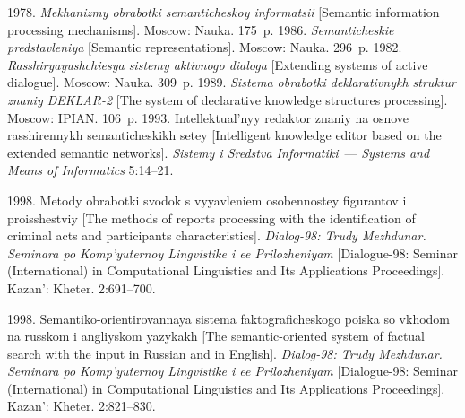 
 \vspace*{-6pt}

 \begin{multicols}{2}

 \renewcommand{\bibname}{\protect\rmfamily References}

 {\small\frenchspacing
 {%
 \begin{thebibliography}{99}
 1978. \textit{Mekhanizmy obrabotki semanticheskoy informatsii} [Semantic information
processing mechanisms]. Moscow: Nauka. 175~p.
 1986. \textit{Semanticheskie predstavleniya} [Semantic representations]. Moscow:
Nauka. 296~p.
 1982. \textit{Rasshiryayushchiesya sistemy aktivnogo dialoga} [Extending systems of
active dialogue]. Moscow: Nauka. 309~p.
 1989. \textit{Sistema obrabotki deklarativnykh struktur znaniy
 \mbox{DEKLAR-2}} [The system
of declarative knowledge structures processing]. Moscow: IPIAN. 106~p.
 1993. Intellektual'nyy redaktor znaniy na osnove rasshirennykh semanticheskikh
setey [Intelligent knowledge editor based on the extended semantic networks].
\textit{Sistemy i Sredstva Informatiki}~--- \textit{Systems and Means of Informatics}
5:14--21.

 1998. Metody obrabotki svodok s vyyavleniem osobennostey figurantov i
proisshestviy [The methods of reports processing with the identification of
criminal acts and participants characteristics].
\textit{Dialog-98: Trudy Mezhdunar. Seminara po Komp'yuternoy Lingvistike i
ee Prilozheniyam} [Dialogue-98:  Seminar (International) in Computational Linguistics and Its
Applications Proceedings]. Kazan': Kheter. 2:691--700.

 1998. Semantiko-orientirovannaya sistema fakto\-gra\-fi\-che\-sko\-go poiska so vkhodom
na russkom i angliyskom yazykakh [The semantic-oriented system of factual search
with the input in  Russian and in English]. \textit{Dialog-98: Trudy
Mezhdunar. Seminara po Komp'yuternoy Lingvistike i ee Prilozheniyam}
[Dialogue-98:   Seminar (International) in Computational
Linguistics and Its Applications Proceedings].
Kazan': Kheter. 2:821--830.


\end{thebibliography}}}
\end{multicols}
